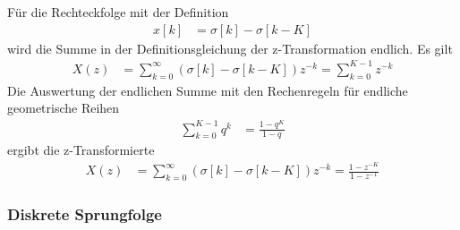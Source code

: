 Für die Rechteckfolge mit der Definition
\begin{align}
x[ k] &= \sigma[ k] - \sigma[ k - K] \label{eq:5.12}
\end{align}
wird die Summe in der Definitionsgleichung der z-Transformation endlich. Es gilt
\begin{align}
X(z) &= \sum\limits_{k = 0}^{\infty}{\left( \sigma[ k] - \sigma[ k - K] \right)  z^{- k}} = \sum\limits_{k = 0}^{K - 1}z^{- k} \label{eq:5.13}
\end{align}
Die Auswertung der endlichen Summe mit den Rechenregeln für endliche geometrische Reihen
\begin{align}
\sum\limits_{k = 0}^{K - 1}q^{k} &= \frac{1 - q^{K}}{1 - q} \label{eq:5.14}
\end{align}
ergibt die z-Transformierte
\begin{align}
X(z) &= \sum\limits_{k = 0}^{\infty}{\left( \sigma[ k] - \sigma[ k - K] \right)  z^{- k}} = \frac{1 - z^{- K}}{1 - z^{- 1}} \label{eq:5.15}
\end{align}
\subsubsection{Diskrete Sprungfolge}\label{sec:diskrete-sprungfolge}

